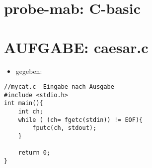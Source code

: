 \documentclass[11pt]{article}
\author{Anton Hofmann}
\date{\today}
\title{}
\begin{document}
\tableofcontents

\section{probe-mab: C-basic}
\label{sec:org163fe42}

\section{AUFGABE: caesar.c}
\label{sec:org38f6b17}
\begin{itemize}
\item gegeben:
\end{itemize}
\lstset{language=C,label= ,caption= ,captionpos=b,numbers=none}
\begin{lstlisting}
//mycat.c  Eingabe nach Ausgabe
#include <stdio.h>
int main(){
	int ch;
	while ( (ch= fgetc(stdin)) != EOF){
		fputc(ch, stdout);
	}

	return 0;
}
\end{lstlisting}
\end{document}
